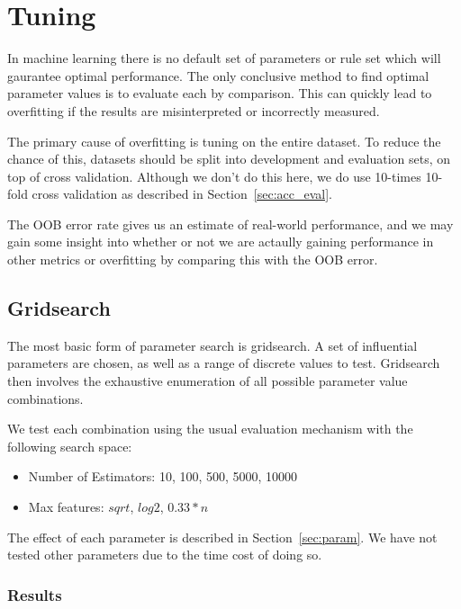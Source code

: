 \section{Tuning}\label{sec:tuning}
In machine learning there is no default set of parameters or rule set which will
gaurantee optimal performance.
The only conclusive method to find optimal parameter values is to evaluate
each by comparison.
This can quickly lead to overfitting if the results are misinterpreted or
incorrectly measured.

The primary cause of overfitting is tuning on the entire dataset.
To reduce the chance of this, datasets should be split into development
and evaluation sets, on top of cross validation.
Although we don't do this here, we do use 10-times 10-fold cross validation as
described in Section~\ref{sec:acc_eval}.

The OOB error rate gives us an estimate of real-world performance, and we may
gain some insight into whether or not we are actaully gaining performance in
other metrics or overfitting by comparing this with the OOB error.


\subsection{Gridsearch}
The most basic form of parameter search is gridsearch.
A set of influential parameters are chosen, as well as a range of discrete
values to test.
Gridsearch then involves the exhaustive enumeration of all possible parameter
value combinations.

We test each combination using the usual evaluation mechanism with the following
search space:
\begin{itemize}
  \item Number of Estimators: 10, 100, 500, 5000, 10000
  \item Max features: $sqrt$, $log2$, $0.33*n$
\end{itemize}

The effect of each parameter is described in Section~\ref{sec:param}.
We have not tested other parameters due to the time cost of doing so.


\subsubsection{Results}

